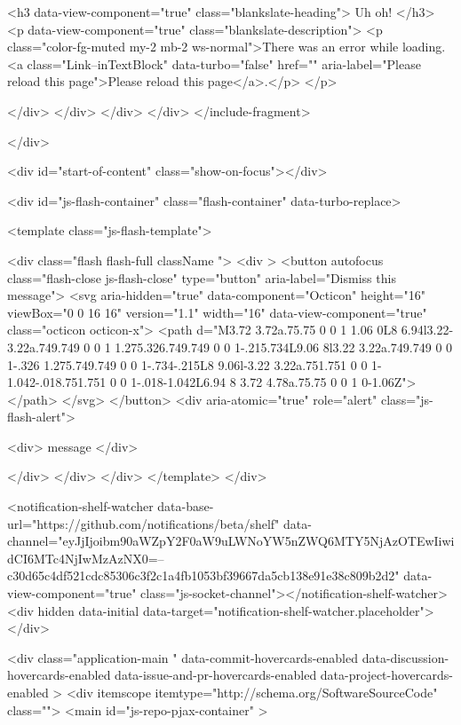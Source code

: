{{{      <h3 data-view-component="true" class="blankslate-heading">        Uh oh!
</h3>
      <p data-view-component="true" class="blankslate-description">        <p class="color-fg-muted my-2 mb-2 ws-normal">There was an error while loading. <a class="Link--inTextBlock" data-turbo="false" href="" aria-label="Please reload this page">Please reload this page</a>.</p>
</p>

</div>  </div>
</div>  </div>
</include-fragment>

          
    </div>

  <div id="start-of-content" class="show-on-focus"></div>








    <div id="js-flash-container" class="flash-container" data-turbo-replace>





  <template class="js-flash-template">
    
<div class="flash flash-full   {{ className }}">
  <div >
    <button autofocus class="flash-close js-flash-close" type="button" aria-label="Dismiss this message">
      <svg aria-hidden="true" data-component="Octicon" height="16" viewBox="0 0 16 16" version="1.1" width="16" data-view-component="true" class="octicon octicon-x">
    <path d="M3.72 3.72a.75.75 0 0 1 1.06 0L8 6.94l3.22-3.22a.749.749 0 0 1 1.275.326.749.749 0 0 1-.215.734L9.06 8l3.22 3.22a.749.749 0 0 1-.326 1.275.749.749 0 0 1-.734-.215L8 9.06l-3.22 3.22a.751.751 0 0 1-1.042-.018.751.751 0 0 1-.018-1.042L6.94 8 3.72 4.78a.75.75 0 0 1 0-1.06Z"></path>
</svg>
    </button>
    <div aria-atomic="true" role="alert" class="js-flash-alert">
      
      <div>{{ message }}</div>

    </div>
  </div>
</div>
  </template>
</div>


    
  <notification-shelf-watcher data-base-url="https://github.com/notifications/beta/shelf" data-channel="eyJjIjoibm90aWZpY2F0aW9uLWNoYW5nZWQ6MTY5NjAzOTEwIiwidCI6MTc4NjIwMzAzNX0=--c30d65c4df521cdc85306c3f2c1a4fb1053bf39667da5cb138e91e38c809b2d2" data-view-component="true" class="js-socket-channel"></notification-shelf-watcher>
  <div hidden data-initial data-target="notification-shelf-watcher.placeholder"></div>






  <div
    class="application-main "
    data-commit-hovercards-enabled
    data-discussion-hovercards-enabled
    data-issue-and-pr-hovercards-enabled
    data-project-hovercards-enabled
  >
        <div itemscope itemtype="http://schema.org/SoftwareSourceCode" class="">
    <main id="js-repo-pjax-container" >
      
}}}
